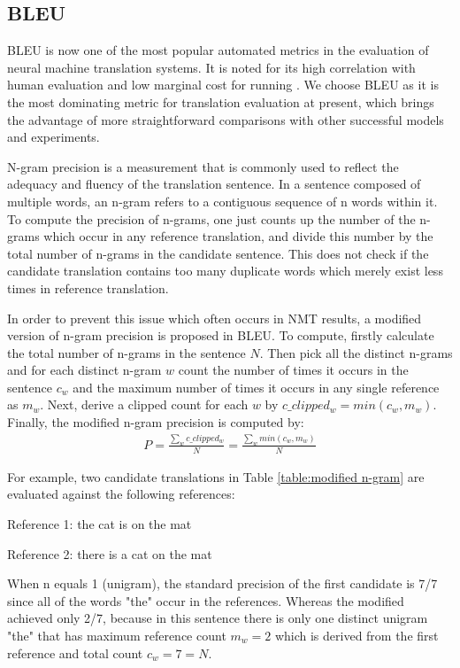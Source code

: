 \subsection{BLEU}

BLEU is now one of the most popular automated metrics in the evaluation of neural machine translation systems. It is noted for its high correlation with human evaluation and low marginal cost for running \cite{Papineni2002}. We choose BLEU as it is the most dominating metric for translation evaluation at present, which brings the advantage of more straightforward comparisons with other successful models and experiments.

N-gram precision is a measurement that is commonly used to reflect the adequacy and fluency of the translation sentence. In a sentence composed of multiple words, an n-gram refers to a contiguous sequence of n words within it. To compute the precision of n-grams, one just counts up the number of the n-grams which occur in any reference translation, and divide this number by the total number of n-grams in the candidate sentence. This does not check if the candidate translation contains too many duplicate words which merely exist less times in reference translation. 

In order to prevent this issue which often occurs in NMT results, a modified version of n-gram precision is proposed in BLEU. To compute, firstly calculate the total number of n-grams in the sentence $ N $. Then pick all the distinct n-grams and for each distinct n-gram $ w $ count the number of times it occurs in the sentence $ c_{w} $ and the maximum number of times it occurs in any single reference as $ m_{w} $. Next, derive a clipped count for each $ w $ by $ c\_clipped_{w} = min(c_{w},m_{w}) $. Finally, the modified n-gram precision is computed by:
\begin{align*}
P = \frac{\sum_{w}c\_clipped_{w}}{N} = \frac{\sum_{w}min(c_{w},m_{w})}{N}
\end{align*}

For example, two candidate translations in Table \ref{table:modified n-gram} are evaluated against the following references:

Reference 1: the cat is on the mat

Reference 2: there is a cat on the mat

When n equals 1 (unigram), the standard precision of the first candidate is 7/7 since all of the words "the" occur in the references. Whereas the modified achieved only 2/7, because in this sentence there is only one distinct unigram "the" that has maximum reference count $ m_{w} = 2 $ which is derived from the first reference and total count $ c_{w} = 7 = N $.

